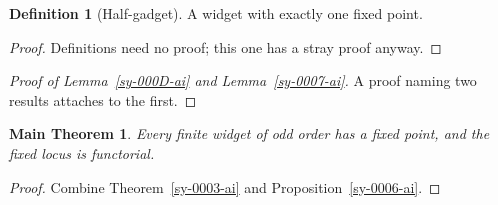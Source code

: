 \documentclass{amsart}
\theoremstyle{plain}
\newtheorem*{mainthm}{Main Theorem}
\theoremstyle{definition}
\newtheorem{definition}[theorem]{Definition}
\theoremstyle{remark}
\begin{document}
\begin{definition}[Half-gadget]\label{sy-000E-ai}
A widget with exactly one fixed point.
\end{definition}
\begin{proof}
Definitions need no proof; this one has a stray proof anyway.
\end{proof}


\begin{proof}[Proof of Lemma~\ref{sy-000D-ai} and Lemma~\ref{sy-0007-ai}]
A proof naming two results attaches to the first.
\end{proof}

\begin{mainthm}\label{sy-000B-ai}
Every finite widget of odd order has a fixed point, and the fixed locus is functorial.
\end{mainthm}
\begin{proof}
Combine Theorem~\ref{sy-0003-ai} and Proposition~\ref{sy-0006-ai}.
\end{proof}




\end{document}
